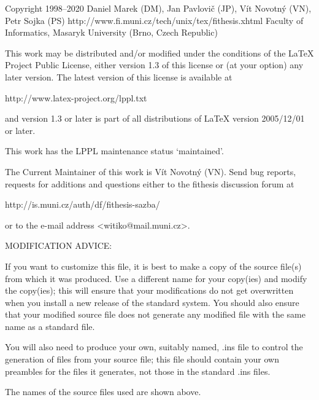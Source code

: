 
\preamble

Copyright 1998--2020  Daniel Marek (DM), Jan Pavlovič (JP),
                      Vít Novotný (VN), Petr Sojka (PS)
http://www.fi.muni.cz/tech/unix/tex/fithesis.xhtml
Faculty of Informatics, Masaryk University (Brno, Czech Republic)

This work may be distributed and/or modified under the
conditions of the LaTeX Project Public License, either version
1.3 of this license or (at your option) any later version.
The latest version of this license is available at

  http://www.latex-project.org/lppl.txt

and version 1.3 or later is part of all distributions of LaTeX
version 2005/12/01 or later.

This work has the LPPL maintenance status `maintained'.

The Current Maintainer of this work is Vít Novotný (VN).
Send bug reports, requests for additions and questions
either to the fithesis discussion forum at

  http://is.muni.cz/auth/df/fithesis-sazba/

or to the e-mail address <witiko@mail.muni.cz>.


MODIFICATION ADVICE:

If you want to customize this file, it is best to make a copy of
the source file(s) from which it was produced.  Use a different
name for your copy(ies) and modify the copy(ies); this will ensure
that your modifications do not get overwritten when you install a
new release of the standard system.  You should also ensure that
your modified source file does not generate any modified file with
the same name as a standard file.

You will also need to produce your own, suitably named, .ins file to
control the generation of files from your source file; this file
should contain your own preambles for the files it generates, not
those in the standard .ins files.

The names of the source files used are shown above.

\endpreamble
\askforoverwritefalse
